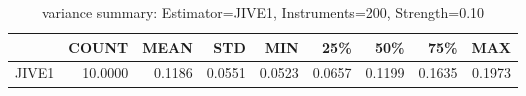 \begin{table}[ht]
\centering
\caption{variance summary: Estimator=JIVE1, Instruments=200, Strength=0.10}
\begin{tabular}{lrrrrrrrr}
\toprule
 & COUNT & MEAN & STD & MIN & 25\% & 50\% & 75\% & MAX \\
\midrule
JIVE1 & 10.0000 & 0.1186 & 0.0551 & 0.0523 & 0.0657 & 0.1199 & 0.1635 & 0.1973 \\
\bottomrule
\end{tabular}
\end{table}
